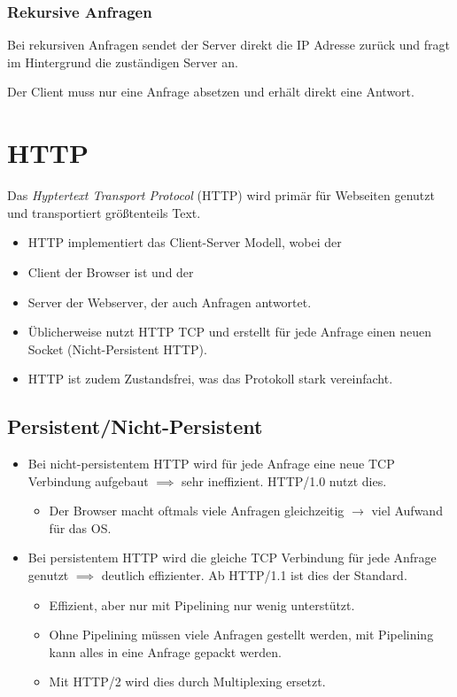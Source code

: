 			\subsubsection{Rekursive Anfragen}
				Bei rekursiven Anfragen sendet der Server direkt die IP Adresse zurück und fragt im Hintergrund die zuständigen Server an.

				Der Client muss nur eine Anfrage absetzen und erhält direkt eine Antwort.

	\section{HTTP} %
		Das \textit{Hyptertext Transport Protocol} (HTTP) wird primär für Webseiten genutzt und transportiert größtenteils Text.

		\begin{itemize}
			\item HTTP implementiert das Client-Server Modell, wobei der
			\item Client der Browser ist und der
			\item Server der Webserver, der auch Anfragen antwortet.
			\item Üblicherweise nutzt HTTP TCP und erstellt für jede Anfrage einen neuen Socket (Nicht-Persistent HTTP).
			\item HTTP ist zudem Zustandsfrei, was das Protokoll stark vereinfacht.
		\end{itemize}

		\subsection{Persistent/Nicht-Persistent} %
			\begin{itemize}
				\item Bei nicht-persistentem HTTP wird für jede Anfrage eine neue TCP Verbindung aufgebaut \(\implies\) sehr ineffizient. HTTP/1.0 nutzt dies.
					\begin{itemize}
						\item Der Browser macht oftmals viele Anfragen gleichzeitig \(\rightarrow\) viel Aufwand für das OS.
					\end{itemize}
				\item Bei persistentem HTTP wird die gleiche TCP Verbindung für jede Anfrage genutzt \(\implies\) deutlich effizienter. Ab HTTP/1.1 ist dies der Standard.
					\begin{itemize}
						\item Effizient, aber nur mit Pipelining nur wenig unterstützt.
						\item Ohne Pipelining müssen viele Anfragen gestellt werden, mit Pipelining kann alles in eine Anfrage gepackt werden.
						\item Mit HTTP/2 wird dies durch Multiplexing ersetzt.
					\end{itemize}
			\end{itemize}

